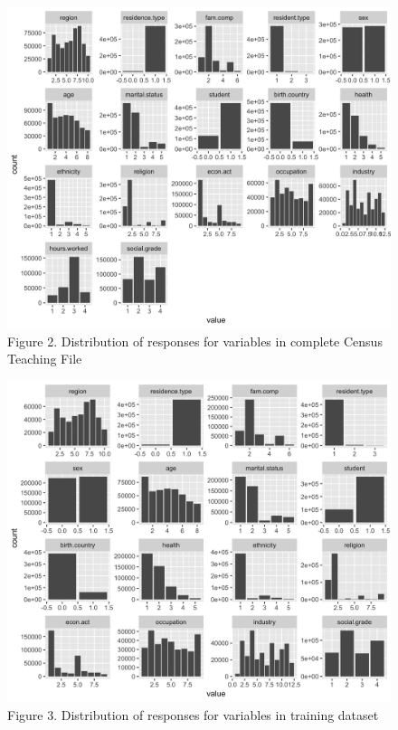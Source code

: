 \documentclass[]{book}
\begin{document}
\begin{figure}
\centering
\includegraphics{images/dist_all.png}
\caption{Figure 2. Distribution of responses for variables in complete
Census Teaching File}
\end{figure}

\begin{figure}
\centering
\includegraphics{images/dist_train.png}
\caption{Figure 3. Distribution of responses for variables in training
dataset}
\end{figure}
\end{document}
